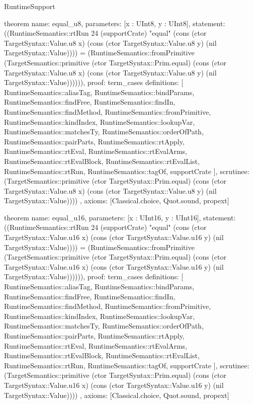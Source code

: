 \begin{lexlean}{RuntimeSupport}
\begin{semanticmodule}
theorem{
  name: equal_u8,
  parameters: [x : UInt8, y : UInt8],
  statement: ((RuntimeSemantics::rtRun 24 (supportCrate) "equal" (cons (ctor TargetSyntax::Value.u8 x) (cons (ctor TargetSyntax::Value.u8 y) (nil TargetSyntax::Value)))) = (RuntimeSemantics::fromPrimitive (TargetSemantics::primitive (ctor TargetSyntax::Prim.equal) (cons (ctor TargetSyntax::Value.u8 x) (cons (ctor TargetSyntax::Value.u8 y) (nil TargetSyntax::Value)))))),
  proof: term_cases{
    definitions: [
      RuntimeSemantics::aliasTag,
      RuntimeSemantics::bindParams,
      RuntimeSemantics::findFree,
      RuntimeSemantics::findIn,
      RuntimeSemantics::findMethod,
      RuntimeSemantics::fromPrimitive,
      RuntimeSemantics::kindIndex,
      RuntimeSemantics::lookupVar,
      RuntimeSemantics::matchesTy,
      RuntimeSemantics::orderOfPath,
      RuntimeSemantics::pairParts,
      RuntimeSemantics::rtApply,
      RuntimeSemantics::rtEval,
      RuntimeSemantics::rtEvalArms,
      RuntimeSemantics::rtEvalBlock,
      RuntimeSemantics::rtEvalList,
      RuntimeSemantics::rtRun,
      RuntimeSemantics::tagOf,
      supportCrate
    ],
    scrutinee: (TargetSemantics::primitive (ctor TargetSyntax::Prim.equal) (cons (ctor TargetSyntax::Value.u8 x) (cons (ctor TargetSyntax::Value.u8 y) (nil TargetSyntax::Value))))
  },
  axioms: [Classical.choice, Quot.sound, propext]
}

theorem{
  name: equal_u16,
  parameters: [x : UInt16, y : UInt16],
  statement: ((RuntimeSemantics::rtRun 24 (supportCrate) "equal" (cons (ctor TargetSyntax::Value.u16 x) (cons (ctor TargetSyntax::Value.u16 y) (nil TargetSyntax::Value)))) = (RuntimeSemantics::fromPrimitive (TargetSemantics::primitive (ctor TargetSyntax::Prim.equal) (cons (ctor TargetSyntax::Value.u16 x) (cons (ctor TargetSyntax::Value.u16 y) (nil TargetSyntax::Value)))))),
  proof: term_cases{
    definitions: [
      RuntimeSemantics::aliasTag,
      RuntimeSemantics::bindParams,
      RuntimeSemantics::findFree,
      RuntimeSemantics::findIn,
      RuntimeSemantics::findMethod,
      RuntimeSemantics::fromPrimitive,
      RuntimeSemantics::kindIndex,
      RuntimeSemantics::lookupVar,
      RuntimeSemantics::matchesTy,
      RuntimeSemantics::orderOfPath,
      RuntimeSemantics::pairParts,
      RuntimeSemantics::rtApply,
      RuntimeSemantics::rtEval,
      RuntimeSemantics::rtEvalArms,
      RuntimeSemantics::rtEvalBlock,
      RuntimeSemantics::rtEvalList,
      RuntimeSemantics::rtRun,
      RuntimeSemantics::tagOf,
      supportCrate
    ],
    scrutinee: (TargetSemantics::primitive (ctor TargetSyntax::Prim.equal) (cons (ctor TargetSyntax::Value.u16 x) (cons (ctor TargetSyntax::Value.u16 y) (nil TargetSyntax::Value))))
  },
  axioms: [Classical.choice, Quot.sound, propext]
}


\end{semanticmodule}
\end{lexlean}
